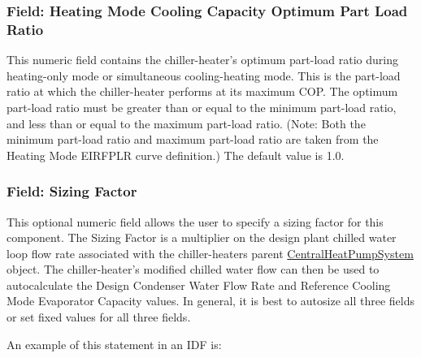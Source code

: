 \subsubsection{Field: Heating Mode Cooling Capacity Optimum Part Load Ratio}\label{field-heating-mode-cooling-capacity-optimum-part-load-ratio}

This numeric field contains the chiller-heater's optimum part-load ratio during heating-only mode or simultaneous cooling-heating mode. This is the part-load ratio at which the chiller-heater performs at its maximum COP. The optimum part-load ratio must be greater than or equal to the minimum part-load ratio, and less than or equal to the maximum part-load ratio. (Note: Both the minimum part-load ratio and maximum part-load ratio are taken from the Heating Mode EIRFPLR curve definition.) The default value is 1.0.

\subsubsection{Field: Sizing Factor}\label{field-sizing-factor-12}

This optional numeric field allows the user to specify a sizing factor for this component. The Sizing Factor is a multiplier on the design plant chilled water loop flow rate associated with the chiller-heaters parent \hyperref[centralheatpumpsystem]{CentralHeatPumpSystem} object. The chiller-heater's modified chilled water flow can then be used to autocalculate the Design Condenser Water Flow Rate and Reference Cooling Mode Evaporator Capacity values. In general, it is best to autosize all three fields or set fixed values for all three fields.

An example of this statement in an IDF is:

